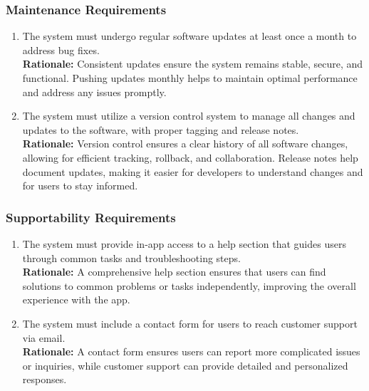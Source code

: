 \documentclass[]{article}
\begin{document}
\subsubsection{Maintenance Requirements}
\label{ssub:maintenance_requirements}
\begin{enumerate}[{MS-M}1. ]
\item The system must undergo regular software updates at least once a month to address bug fixes.\\
\textbf{Rationale:} Consistent updates ensure the system remains stable, secure, and functional. Pushing updates monthly helps to maintain optimal performance and address any issues promptly.
\item The system must utilize a version control system to manage all changes and updates to the software, with proper tagging and release notes.\\
\textbf{Rationale:} Version control ensures a clear history of all software changes, allowing for efficient tracking, rollback, and collaboration. Release notes help document updates, making it easier for developers to understand changes and for users to stay informed.
\end{enumerate}

\subsubsection{Supportability Requirements}
\label{ssub:supportability_requirements}
\begin{enumerate}[{MS-S}1. ]
\item The system must provide in-app access to a help section that guides users through common tasks and troubleshooting steps.\\
\textbf{Rationale:} A comprehensive help section ensures that users can find solutions to common problems or tasks independently, improving the overall experience with the app.
\item The system must include a contact form for users to reach customer support via email.\\
\textbf{Rationale:} A contact form ensures users can report more complicated issues or inquiries, while customer support can provide detailed and personalized responses.
\end{enumerate}
\end{document}
